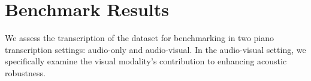 \documentclass{article}
\begin{document}



\section{Benchmark Results}\label{sec:transcription}



We assess the transcription of the dataset for benchmarking in two piano transcription settings: audio-only and audio-visual. In the audio-visual setting, we specifically examine the visual modality's contribution to enhancing acoustic robustness. 
\end{document}
